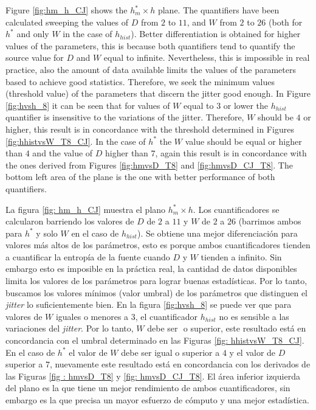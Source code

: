 
Figure \ref{fig:hm_h_CJ} shows the $h^*_{m} \times h$ plane. The quantifiers have been calculated sweeping the values of $D$ from $2$ to $11$, and $W$ from $2$ to $26$ (both for $h^*$ and only $W$ in the case of $h_{hist}$).
Better differentiation is obtained for higher values of the parameters, this is because both quantifiers tend to quantify the source value for $D$ and $W$ equal to infinite.
Nevertheless, this is impossible in real practice, also the amount of data available limits the values of the parameters based to achieve good statistics. Therefore, we seek the minimum values (threshold value) of the parameters that discern the jitter good enough. In Figure \ref{fig:hvsh_8} it can be seen that for values of $W$ equal to $3$ or lower the $h_{hist}$ quantifier is insensitive to the variations of the jitter. Therefore, $W$ should be $4$ or higher, this result is in concordance with the threshold determined in Figures \ref{fig:hhistvsW_T8_CJ}. In the case of $h^*$ the $W$ value should be equal or higher than $4$ and the value of $D$ higher than $7$, again this result is in concordance with the ones derived from Figures \ref{fig:hmvsD_T8} and \ref{fig:hmvsD_CJ_T8}. The bottom left area of the plane is the one with better performance of both quantifiers.

La figura \ref{fig: hm_h_CJ} muestra el plano $h^*_{m} \times h$.
Los cuantificadores se calcularon barriendo los valores de $D$ de $2$ a $11$ y $W$ de $2$ a $26$ (barrimos ambos para $h^*$ y solo $W$ en el caso de $h_{hist}$).
Se obtiene una mejor diferenciación para valores más altos de los parámetros, esto es porque ambos cuantificadores tienden a cuantificar la entropía de la fuente cuando $D$ y $W$ tienden a infinito.
Sin embargo esto es imposible en la práctica real, la cantidad de datos disponibles limita los valores de los parámetros para lograr buenas estadísticas.
Por lo tanto, buscamos los valores mínimos (valor umbral) de los parámetros que distinguen el \textit{jitter} lo suficientemente bien.
En la figura \ref{fig:hvsh_8} se puede ver que para valores de $W$ iguales o menores a $3$, el cuantificador $h_{hist}$ no es sensible a las variaciones del \textit{jitter}.
Por lo tanto, $W$ debe ser $ $ o superior, este resultado está en concordancia con el umbral determinado en las Figuras \ref{fig: hhistvsW_T8_CJ}.
En el caso de $h^*$ el valor de $W$ debe ser igual o superior a $4$ y el valor de $D$ superior a $7$, nuevamente este resultado está en concordancia con los derivados de las Figuras \ref{fig : hmvsD_T8} y \ref{fig: hmvsD_CJ_T8}.
El área inferior izquierda del plano es la que tiene un mejor rendimiento de ambos cuantificadores, sin embargo es la que precisa un mayor esfuerzo de cómputo y una mejor estadística.

